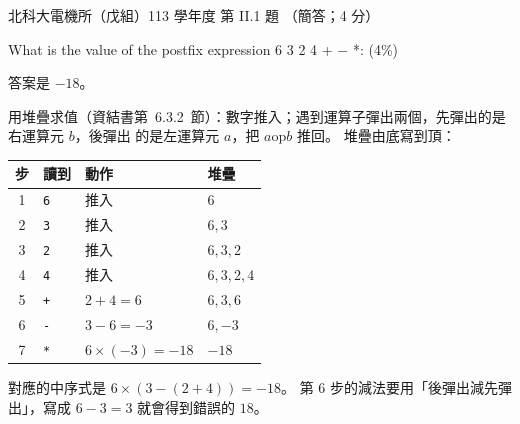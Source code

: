 \begin{pastexam}[label={px:ntut-113-ee-ds-05}]{北科大電機所（戊組）113 學年度 第 II.1 題}
（簡答；4 分）

What is the value of the postfix expression 6 3 2 4 + $-$ *: (4\%)
\end{pastexam}

\begin{pastsoln}
答案是 $-18$。

用堆疊求值（資結書第~6.3.2~節）：數字推入；遇到運算子彈出兩個，先彈出的是右運算元 $b$，後彈出
的是左運算元 $a$，把 $a \mathbin{\mathrm{op}} b$ 推回。 堆疊由底寫到頂：
\begin{center}
\begin{tabular}{clll}
\toprule
步 & 讀到 & 動作 & 堆疊 \\
\midrule
1 & \texttt{6} & 推入 & $6$ \\
2 & \texttt{3} & 推入 & $6, 3$ \\
3 & \texttt{2} & 推入 & $6, 3, 2$ \\
4 & \texttt{4} & 推入 & $6, 3, 2, 4$ \\
5 & \texttt{+} & $2 + 4 = 6$ & $6, 3, 6$ \\
6 & \texttt{-} & $3 - 6 = -3$ & $6, -3$ \\
7 & \texttt{*} & $6 \times (-3) = -18$ & $-18$ \\
\bottomrule
\end{tabular}
\end{center}
對應的中序式是 $6 \times (3 - (2 + 4)) = -18$。 第 6 步的減法要用「後彈出減先彈出」，寫成
$6 - 3 = 3$ 就會得到錯誤的 $18$。
\end{pastsoln}
